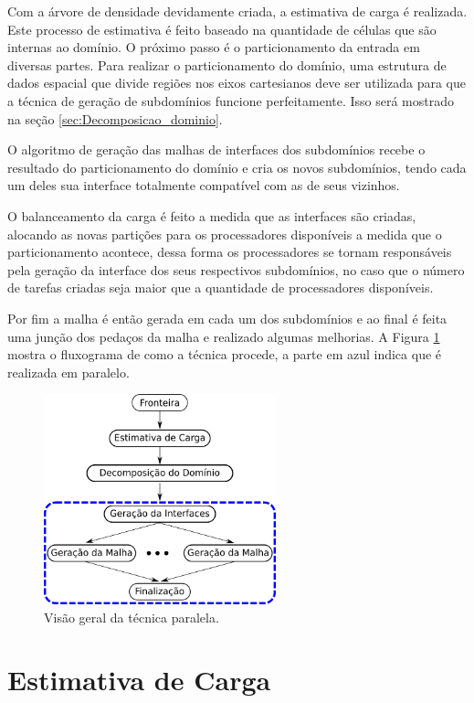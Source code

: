 Com a árvore de densidade devidamente criada, a estimativa de carga é realizada. Este processo de estimativa é feito baseado na quantidade de células que são internas ao domínio. O próximo passo é o particionamento da entrada em diversas partes. Para realizar o particionamento do domínio, uma estrutura de dados espacial que divide regiões nos eixos cartesianos deve ser utilizada para que a técnica de geração de subdomínios funcione perfeitamente. Isso será mostrado na seção \ref{sec:Decomposicao_dominio}.

O algoritmo de geração das malhas de interfaces dos subdomínios recebe o resultado do particionamento do domínio e cria os novos subdomínios, tendo cada um deles sua interface totalmente compatível com as de seus vizinhos.

O balanceamento da carga é feito a medida que as interfaces são criadas, alocando as novas partições para os processadores disponíveis a medida que o particionamento acontece, dessa forma os processadores se tornam responsáveis pela geração da interface dos seus respectivos subdomínios, no caso que o número de tarefas criadas seja maior que a quantidade de processadores disponíveis. 

Por fim a malha é então gerada em cada um dos subdomínios e ao final é feita uma junção dos pedaços da malha e realizado algumas melhorias. A Figura \ref{fig:fluxograma} mostra o fluxograma de como a técnica procede, a parte em azul indica que é realizada em paralelo.

\begin{figure}[!ht]
	\centering
	\includegraphics[width=0.6\textwidth]{fig/fluxograma.png}
	\caption{Visão geral da técnica paralela.}
	\label{fig:fluxograma}
\end{figure}


\section{Estimativa de Carga} 
\label{sec:Estimativa_de_Carga}

